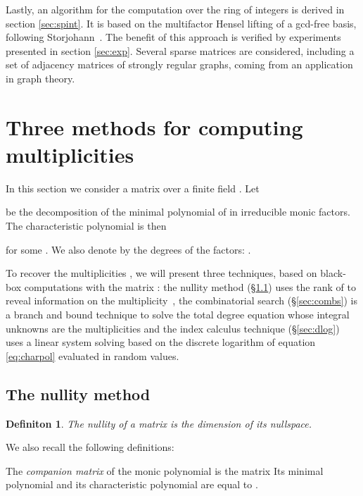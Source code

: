 \documentclass{article}
\newtheorem{defn}[thm]{Definiton}
\begin{document}
Lastly, an algorithm for the computation over the ring of integers is derived in
section \ref{sec:spint}.
It is based on the  multifactor Hensel lifting of a gcd-free basis, following Storjohann~\cite{Storjohann:2000:Frob}. 
The benefit of this approach is verified by experiments
presented in section \ref{sec:exp}. Several sparse matrices are considered,
including a set of  adjacency matrices of strongly regular graphs, coming from an
application in graph theory.













\section{Three methods for computing multiplicities}\label{sec:multip}

In this section we consider a matrix  over a finite field
.
Let 

be the decomposition of the minimal polynomial of  in irreducible monic
factors. The characteristic polynomial is then 
 
for some . We also denote by  the degrees of
the factors: .

To recover the multiplicities , we will present three techniques,
based on black-box computations with the matrix :
the nullity method (\S \ref{sec:nullity}) uses the
rank of  to reveal information on the multiplicity~, 
the combinatorial search (\S \ref{sec:combs}) is a branch and bound
technique to solve the total degree equation whose integral unknowns are the
multiplicities and the index calculus technique (\S \ref{sec:dlog}) uses a
linear system solving based  on the discrete logarithm  
 of equation \ref{eq:charpol} evaluated in random values.


\subsection{The nullity method}
\label{sec:nullity}
\begin{defn}The nullity   of a matrix   is the dimension of its nullspace.
\end{defn}
We also recall the following definitions:


The \textit{companion matrix} of the monic polynomial 
 is the matrix
{\scriptsize
}
Its minimal polynomial and its characteristic polynomial are equal to .
\end{document}

